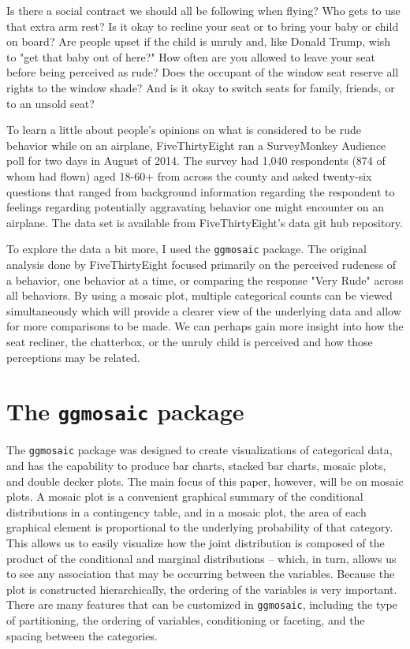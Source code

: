 \documentclass[DIV=calc, paper=a4, fontsize=10pt, twocolumn]{scrartcl}	 %
\begin{document}
\par Is there a social contract we should all be following when flying? Who gets to use that extra arm rest? Is it okay to recline your seat or to bring your baby or child on board? Are people upset if the child is unruly and, like Donald Trump, wish to "get that baby out of here?" \citep{cnn} How often are you allowed to leave your seat before being perceived as rude? Does the occupant of the window seat reserve all rights to the window shade? And is it okay to switch seats for family, friends, or to an unsold seat?

\par To learn a little about people's opinions on what is considered to be rude behavior while on an airplane, FiveThirtyEight ran a SurveyMonkey Audience poll for two days in August of 2014.  \citep{fivethirtyeight} The survey had 1,040 respondents (874 of whom had flown) aged 18-60+ from across the county and asked twenty-six questions that ranged from background information regarding the respondent to feelings regarding potentially aggravating behavior one might encounter on an airplane. The data set is available from FiveThirtyEight's data git hub repository.

\par To explore the data a bit more, I used the \texttt{ggmosaic} package. The original analysis done by FiveThirtyEight focused primarily on the perceived rudeness of a behavior, one behavior at a time, or comparing the response "Very Rude" across all behaviors. By using a mosaic plot, multiple categorical counts can be viewed simultaneously which will provide a clearer view of the underlying data and allow for more comparisons to be made. We can perhaps gain more insight into how the seat recliner, the chatterbox, or the unruly child is perceived and how those perceptions may be related.


\section*{The \texttt{ggmosaic} package}

\par The \texttt{ggmosaic} package was designed to create visualizations of categorical data, and has the capability to produce bar charts, stacked bar charts, mosaic plots, and double decker plots. The main focus of this paper, however, will be on mosaic plots. A mosaic plot is a convenient graphical summary of the conditional distributions in a contingency table, and in a mosaic plot, the area of each graphical element is proportional to the underlying probability of that category. This allows us to easily visualize how the joint distribution is composed of the product of the conditional and marginal distributions -- which, in turn, allows us to see any association that may be occurring between the variables. Because the plot is constructed hierarchically, the ordering of the variables is very important.  There are many features that can be customized in \texttt{ggmosaic}, including the type of partitioning, the ordering of variables, conditioning or faceting, and the spacing between the categories.
\end{document}
